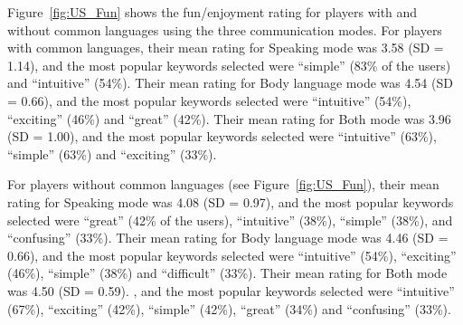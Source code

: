 


Figure~\ref{fig:US_Fun} shows the fun/enjoyment rating for players with and without common languages using the three communication modes. 
For players with common languages, their mean rating for Speaking mode was 3.58 (SD = 1.14), and the most popular keywords selected were ``simple'' (83\% of the users) and ``intuitive'' (54\%). 
Their mean rating for Body language mode was 4.54 (SD = 0.66), and the most popular keywords selected were ``intuitive'' (54\%), ``exciting'' (46\%) and ``great'' (42\%). 
Their mean rating for Both mode was 3.96 (SD = 1.00), and the most popular keywords selected were ``intuitive'' (63\%), ``simple'' (63\%) and ``exciting'' (33\%). 

For players without common languages (see Figure~\ref{fig:US_Fun}), 
their mean rating for Speaking mode was 4.08 (SD = 0.97), and the most popular keywords selected were ``great'' (42\% of the users), ``intuitive'' (38\%), ``simple'' (38\%), and ``confusing'' (33\%). 
Their mean rating for Body language mode was 4.46 (SD = 0.66), and the most popular keywords selected were ``intuitive'' (54\%), ``exciting'' (46\%), ``simple'' (38\%) and ``difficult'' (33\%). 
Their mean rating for Both mode was 4.50 (SD = 0.59). , and the most popular keywords selected were ``intuitive'' (67\%), ``exciting'' (42\%), ``simple'' (42\%), ``great'' (34\%) and ``confusing'' (33\%).

